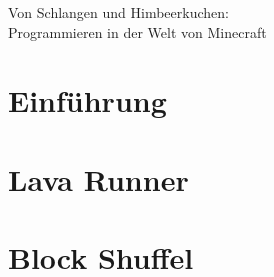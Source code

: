 \documentclass{article}
\begin{document}
	\begin{center}
		\huge Von Schlangen und Himbeerkuchen:\\Programmieren in der Welt von Minecraft
	\end{center}
	\section{Einführung}
		
	\section{Lava Runner}
		
	\section{Block Shuffel}
\end{document}
